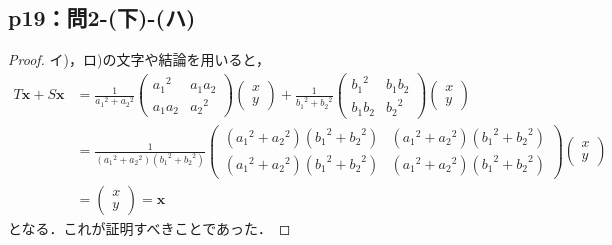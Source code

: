 \documentclass[a4paper,10pt,fleqn]{ltjsarticle}
\begin{document}
\subsection*{p19：問2-(下)-(ハ)}
\begin{tleftbar}
  \begin{proof}
    イ)，ロ)の文字や結論を用いると，
    \begin{align*}
      T \bm{x} + S \bm{x} & =
      \frac{1}{{a_1}^2+{a_2}^2}
      \begin{pmatrix}
        {a_1}^2 & a_1 a_2 \\
        a_1 a_2 & {a_2}^2
      \end{pmatrix}
      \begin{pmatrix}
        x \\
        y
      \end{pmatrix}
      +
      \frac{1}{{b_1}^2+{b_2}^2}
      \begin{pmatrix}
        {b_1}^2 & b_1 b_2 \\
        b_1 b_2 & {b_2}^2
      \end{pmatrix}
      \begin{pmatrix}
        x \\
        y
      \end{pmatrix}
      \\
                          & = \frac{1}{({a_1}^2+{a_2}^2)({b_1}^2+{b_2}^2)}
      \begin{pmatrix}
        ({a_1}^2+{a_2}^2)({b_1}^2+{b_2}^2) & ({a_1}^2+{a_2}^2)({b_1}^2+{b_2}^2) \\
        ({a_1}^2+{a_2}^2)({b_1}^2+{b_2}^2) & ({a_1}^2+{a_2}^2)({b_1}^2+{b_2}^2)
      \end{pmatrix}
      \begin{pmatrix}
        x \\
        y
      \end{pmatrix}
      \\
                          & =\begin{pmatrix}
                               x \\
                               y
                             \end{pmatrix}
      =\bm{x}
    \end{align*}
    となる．これが証明すべきことであった．
  \end{proof}
\end{tleftbar}
\end{document}

